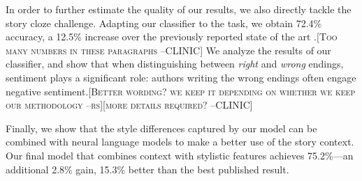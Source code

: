 \documentclass[11pt,a4paper]{article}
\newcommand{\resolved}[1]{}
\newcommand{\roy}[1]{{\color{orange}\textsc{[#1 --rs]}}}
\newcommand{\nascomment}[1]{{\color{blue}\textsc{[#1 --nas]}}}
\newcommand{\clinic}[1]{{\color{magenta}\textsc{[#1 --CLINIC]}}}
\begin{document}

In order to further estimate the quality of our results, we 
also directly tackle the story cloze challenge. 
Adapting our classifier to the task, we obtain 72.4\% accuracy, a 12.5\% increase 
over the previously reported state of the art 
\cite{Salle:2016}.\clinic{Too many numbers in these paragraphs}
We analyze the results of our classifier, and show that when distinguishing between {\it right} and {\it wrong} endings,  \resolved{\nascomment{feels like a leap here, maybe
  change wording a bit -- will come back to this.  note after reading
  all the way to the end:  need to be careful about conclusions drawn
  from weights alone }} sentiment plays a significant role: authors writing the wrong endings often engage negative sentiment.\roy{Better wording? we keep it depending on whether we keep our methodology}\clinic{more details required?}

Finally, we show that the style differences captured by our model can be combined with 
neural language models to make a better use of the story context. 
Our final model that combines context with stylistic features achieves
75.2\%---an additional 2.8\% gain, 15.3\% better than the best
published result.\resolved{\footnote{
I commented out this footnote, because we mention this later.  We
should only mention it once and not in the intro.
}}
\end{document}
